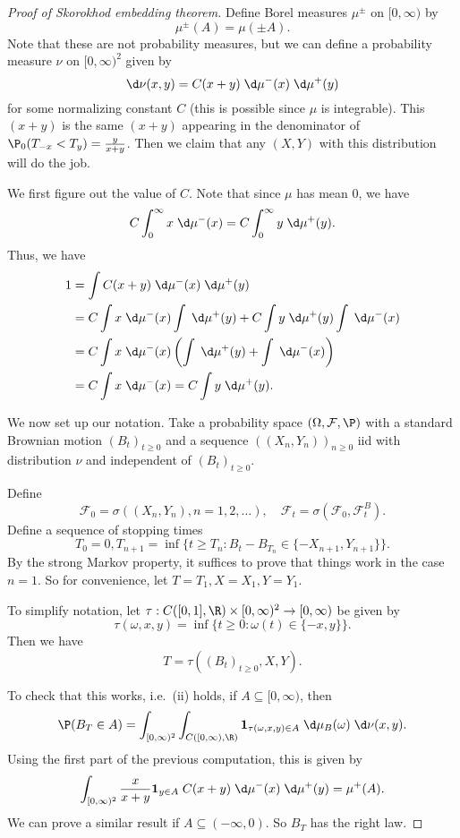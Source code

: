 \documentclass[a4paper]{article}
\begin{document}
\begin{proof}[Proof of Skorokhod embedding theorem]
  Define Borel measures $\mu^{\pm}$ on $[0, \infty)$ by
  \[
    \mu^{\pm}(A) = \mu(\pm A).
  \]
  Note that these are not probability measures, but we can define a probability measure $\nu$ on $[0, \infty)^2$ given by
  \[
    \d \nu(x, y) = C(x + y)\; \d \mu^-(x) \;\d \mu^+(y)
  \]
  for some normalizing constant $C$ (this is possible since $\mu$ is integrable). This $(x + y)$ is the same $(x + y)$ appearing in the denominator of $\P_0(T_{-x} < T_y) = \frac{y}{x + y}$. Then we claim that any $(X, Y)$ with this distribution will do the job.

  We first figure out the value of $C$. Note that since $\mu$ has mean $0$, we have
  \[
    C \int_0^\infty x \;\d \mu^-(x) = C \int_0^\infty y \;\d \mu^+(y).
  \]
  Thus, we have
  \begin{align*}
    1 &= \int C(x + y) \;\d \mu^-(x) \;\d \mu^+(y) \\
    &= C \int x\;\d \mu^-(x) \int \;\d \mu^+(y) + C \int y\;\d \mu^+(y) \int\;\d \mu^-(x)\\
    &= C \int x \;\d \mu^-(x) \left( \int \;\d \mu^+(y) + \int\;\d \mu^-(x)\right) \\
    &= C \int x\;\d \mu^-(x) = C \int y\;\d \mu^+(y).
  \end{align*}

  We now set up our notation. Take a probability space $(\Omega, \mathcal{F}, \P)$ with a standard Brownian motion $(B_t)_{t \geq 0}$ and a sequence $((X_n, Y_n))_{n \geq 0}$ iid with distribution $\nu$ and independent of $(B_t)_{t \geq 0}$.

  Define
  \[
    \mathcal{F}_0 = \sigma((X_n, Y_n), n = 1, 2, \ldots),\quad
    \mathcal{F}_t = \sigma(\mathcal{F}_0, \mathcal{F}_t^B).
  \]
  Define a sequence of stopping times
  \[
    T_0 = 0, T_{n + 1} = \inf\{t \geq T_n: B_t - B_{T_n} \in \{-X_{n + 1}, Y_{n + 1}\}\}.
  \]
  By the strong Markov property, it suffices to prove that things work in the case $n = 1$. So for convenience, let $T = T_1, X = X_1, Y = Y_1$.
  
  To simplify notation, let $\tau: C([0, 1], \R) \times [0, \infty)^2 \to [0, \infty)$ be given by
  \[
    \tau(\omega, x, y) = \inf \{t \geq 0: \omega(t) \in \{-x, y\}\}.
  \]
  Then we have
  \[
    T = \tau((B_t)_{t \geq 0}, X, Y).
  \]

  To check that this works, i.e.\ (ii) holds, if $A \subseteq [0, \infty)$, then
  \[
    \P(B_T \in A) = \int_{[0,\infty)^2} \int_{C([0, \infty), \R)} \mathbf{1}_{\tau(\omega, x, y) \in A} \;\d \mu_B(\omega) \;\d \nu(x, y).
  \]
  Using the first part of the previous computation, this is given by
  \[
    \int_{[0, \infty)^2} \frac{x}{x + y} \mathbf{1}_{y \in A}\; C(x + y) \;\d \mu^-(x) \;\d \mu^+(y) = \mu^+(A).
  \]
  We can prove a similar result if $A \subseteq (-\infty, 0)$. So $B_T$ has the right law.


\end{proof}
\end{document}
